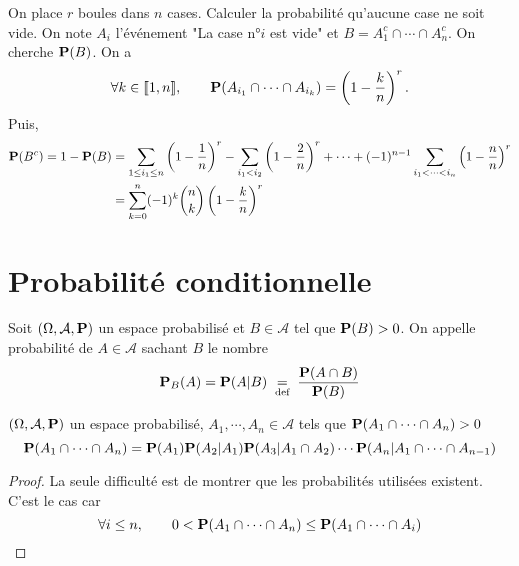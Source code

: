 \begin{ex}
    On place $r$ boules dans $n$ cases. Calculer la probabilité qu'aucune case ne soit vide. On note $A_i$ l'événement "La case n°$i$ est vide" et $B=A_1^c\cap \cdots \cap A_n^c$. On cherche $\P(B)$. On a \[
        \forall k \in  \llbracket 1, n\rrbracket, \qquad \P(A_{i_1}\cap \cdots \cap A_{i_k})= \left( 1-\frac{k}{n} \right) ^r.
    \] 
    Puis, \begin{align*}
        \P(B^c)=1-\P(B)&=\sum_{1\leq i_1\leq n} \left( 1-\frac{1}{n} \right) ^r-\sum_{i_1<i_2} \left( 1-\frac{2}{n} \right) ^r+\cdots +(-1)^{n-1} \sum_{i_1<\cdots <i_n} \left( 1-\frac{n}{n} \right) ^r\\
                       &=\sum_{k=0}^n(-1)^k\binom nk \left( 1-\frac{k}{n} \right) ^r
    \end{align*}
\end{ex}

\section{Probabilité conditionnelle}

\begin{dfn}
    Soit $(\Omega, \mathcal A, \P)$ un espace probabilisé et $B\in \mathcal A$ tel que $\P(B)>0$. On appelle probabilité de $A \in \mathcal A$ sachant $B$ le nombre  \[
        \P_B(A)=\P(A|B)\defeq \frac{\P(A\cap B)}{\P(B)}
    \] 
\end{dfn}

\begin{prop}
    \Hyp $(\Omega, \mathcal A, \P)$ un espace probabilisé, $A_1, \cdots , A_n \in  \mathcal A$ tels que $\P(A_1 \cap \cdots \cap A_n)>0$
    \Conc \[
        \P(A_1\cap \cdots \cap A_n)=\P(A_1)\P(A_2|A_1)\P(A_3|A_1\cap A_2)\cdots \P(A_n|A_1\cap\cdots\cap A_{n-1})
    \] 
\end{prop}

\begin{proof}
    La seule difficulté est de montrer que les probabilités utilisées existent. C'est le cas car \[
        \forall i\leq n, \qquad 0<\P(A_1\cap\cdots\cap A_n)\leq \P(A_1\cap \cdots \cap A_i)
    \] 
\end{proof}

